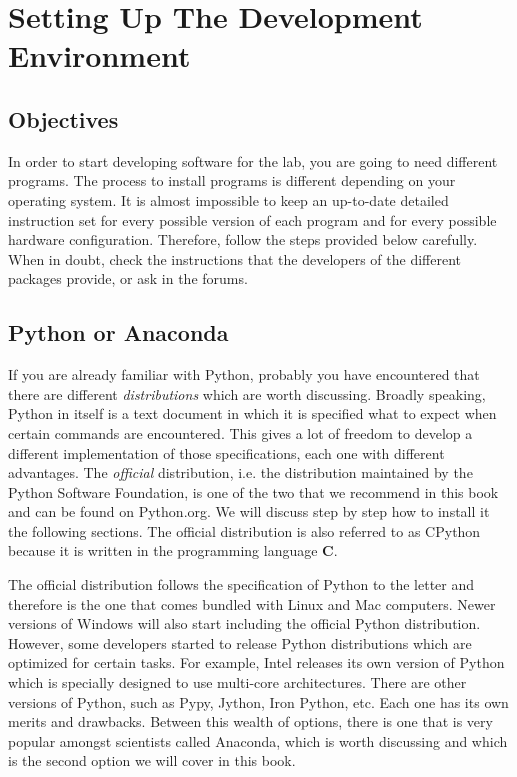 \chapter{Setting Up The Development Environment}\label{chapter:setting-up}
\section{Objectives}
In order to start developing software for the lab, you are going to need different programs. The process to install programs is different depending on your operating system. It is almost impossible to keep an up-to-date detailed instruction set for every possible version of each program and for every possible hardware configuration. Therefore, follow the steps provided below carefully. When in doubt, check the instructions that the developers of the different packages provide, or ask in the forums. 

\section{Python or Anaconda}
If you are already familiar with Python, probably you have encountered that there are different \emph{distributions} which are worth discussing. Broadly speaking, Python in itself is a text document in which it is specified what to expect when certain commands are encountered. This gives a lot of freedom to develop a different implementation of those specifications, each one with different advantages. The \emph{official} distribution, i.e. the distribution maintained by the Python Software Foundation, is one of the two that we recommend in this book and can be found on Python.org. We will discuss step by step how to install it the following sections. The official distribution is also referred to as CPython because it is written in the programming language \textbf{C}. 

The official distribution follows the specification of Python to the letter and therefore is the one that comes bundled with Linux and Mac computers. Newer versions of Windows will also start including the official Python distribution. However, some developers started to release Python distributions which are optimized for certain tasks. For example, Intel releases its own version of Python which is specially designed to use multi-core architectures. There are other versions of Python, such as Pypy, Jython, Iron Python, etc. Each one has its own merits and drawbacks. Between this wealth of options, there is one that is very popular amongst scientists called Anaconda, which is worth discussing and which is the second option we will cover in this book. 

